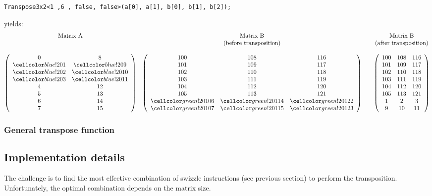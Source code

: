\vspace{2cm}
\begin{minipage}{\linewidth}
	\begin{verbatim}
Transpose3x2<1 ,6 , false, false>(a[0], a[1], b[0], b[1], b[2]);
	\end{verbatim}
	yields:
	\begin{align*}
	\begin{matrix}
	\textrm{Matrix A} & \textrm{Matrix B}  & & \textrm{Matrix B}\\
	&\textrm{(before transposition)}&&\textrm{(after transposition)}\\
	\\
	\left(\begin{array}{cc}
	0 & 8\\
	\colSrc 1 & \colSrc 9\\
	\colSrc 2 & \colSrc 10\\
	\colSrc 3 & \colSrc 11\\
	4 & 12\\
    5 & 13\\
	6 & 14\\
	7 & 15
	\end{array}\right) 
	&
	\left(\begin{array}{ccc}
	100 & 108 & 116\\
	101 & 109 & 117\\
	102 & 110 & 118\\
	103 & 111 & 119\\
	104 & 112 & 120\\
	105 & 113 & 121\\
	\colTgt 106 & \colTgt 114 & \colTgt 122\\
	\colTgt 107 & \colTgt 115 & \colTgt 123
	\end{array}\right) 
	&&
	\left(\begin{array}{ccc}
    100 & 108 & 116\\
    101 & 109 & 117\\
    102 & 110 & 118\\
    103 & 111 & 119\\
    104 & 112 & 120\\
    105 & 113 & 121\\
    1 & 2 & 3\\
    9 & 10 & 11
\end{array}\right) 
	\end{matrix}
	\end{align*}
\end{minipage}

\subsubsection{General transpose function}


\subsection{Implementation details}
The challenge is to find the most effective combination of swizzle instructions (see previous section) to perform the transposition.
Unfortunately, the optimal combination depends on the matrix size.

